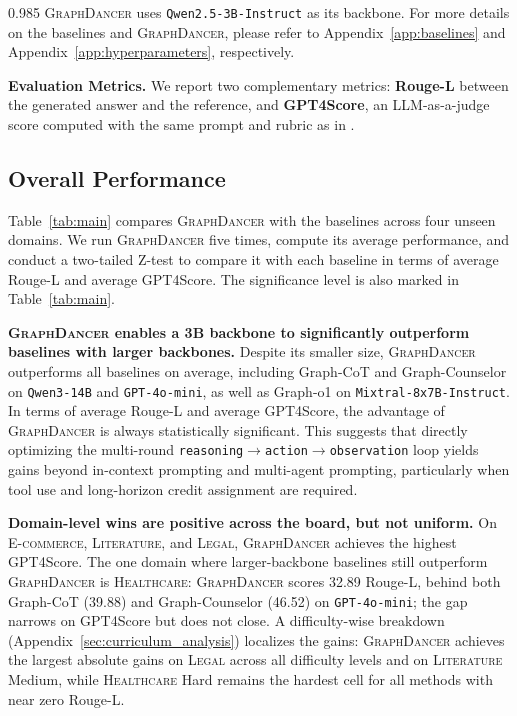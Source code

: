 \documentclass[11pt]{article}
\newcommand{\ours}{\textsc{GraphDancer}\xspace}
\begin{document}
\begin{spacing}{0.985}
\ours uses \texttt{Qwen2.5-3B-Instruct} as its backbone. For more details on the baselines and \ours, please refer to Appendix~\ref{app:baselines} and Appendix~\ref{app:hyperparameters}, respectively.

\smallskip
\noindent \textbf{Evaluation Metrics.}
We report two complementary metrics:
\textbf{Rouge-L} \cite{lin2004automatic} between the generated answer and the reference, and \textbf{GPT4Score}, an LLM-as-a-judge score \cite{li2025generation} computed with the same prompt and rubric as in \citet{jin2024graph}.

\subsection{Overall Performance}
\label{sec:main_results}

Table~\ref{tab:main} compares \ours with the baselines across four unseen domains. We run \ours five times, compute its average performance, and conduct a two-tailed Z-test to compare it with each baseline in terms of average Rouge-L and average GPT4Score. The significance level is also marked in Table~\ref{tab:main}.

\smallskip
\noindent \textbf{\ours enables a 3B backbone to significantly outperform baselines with larger backbones.}
Despite its smaller size, \ours outperforms all baselines on average, including Graph-CoT and Graph-Counselor on \texttt{Qwen3-14B} and \texttt{GPT-4o-mini}, as well as Graph-o1 on \texttt{Mixtral-8x7B-Instruct}. In terms of average Rouge-L and average GPT4Score, the advantage of \ours is always statistically significant. This suggests that directly optimizing the multi-round \texttt{reasoning$\rightarrow$action$\rightarrow$observation} loop yields gains beyond in-context prompting and multi-agent prompting, particularly when tool use and long-horizon credit assignment are required.

\smallskip
\noindent \textbf{Domain-level wins are positive across the board, but not uniform.}
On \textsc{E-commerce}, \textsc{Literature}, and \textsc{Legal}, \ours achieves the highest GPT4Score.
The one domain where larger-backbone baselines still outperform \ours is \textsc{Healthcare}: \ours scores 32.89 Rouge-L, behind both Graph-CoT (39.88) and Graph-Counselor (46.52) on \texttt{GPT-4o-mini}; the gap narrows on GPT4Score but does not close. A difficulty-wise breakdown (Appendix~\ref{sec:curriculum_analysis}) localizes the gains: \ours achieves the largest absolute gains on \textsc{Legal} across all difficulty levels and on \textsc{Literature} Medium, while \textsc{Healthcare} Hard remains the hardest cell for all methods with near zero Rouge-L.

\end{spacing}
\end{document}
